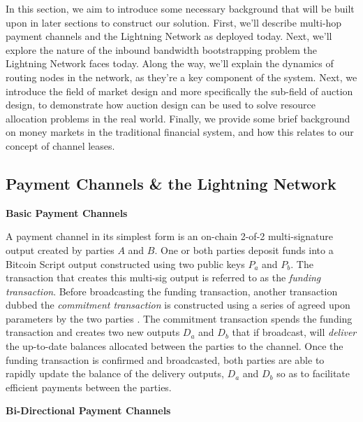 \documentclass[10pt,a4paper]{article}
\theoremstyle{definition}
\begin{document}
In this section, we aim to introduce some necessary background that will be
built upon in later sections to construct our solution. First, we'll describe
multi-hop payment channels and the Lightning Network as deployed today. Next,
we'll explore the nature of the inbound bandwidth bootstrapping problem the
Lightning Network faces today. Along the way, we'll explain the dynamics of
routing nodes in the network, as they're a key component of the system. Next,
we introduce the field of market design and more specifically the sub-field of auction
design, to demonstrate how auction design can be used to solve resource
allocation problems in the real world. Finally, we provide some brief background
on money markets in the traditional financial system, and how this relates to
our concept of channel leases.

\subsection{Payment Channels \& the Lightning Network}

\begin{center}
\textbf{Basic Payment Channels}
\end{center}

A payment channel in its simplest form is an on-chain 2-of-2 multi-signature
output created by parties $A$ and $B$. One or both parties deposit funds into a
Bitcoin Script output constructed using two public keys $P_{a}$ and $P_{b}$.
The transaction that creates this multi-sig output is referred to as the
\emph{funding transaction}. Before broadcasting the funding transaction,
another transaction dubbed the \emph{commitment transaction} is constructed
using a series of agreed upon parameters by the two parties \cite{bolt3}. The
commitment transaction spends the funding transaction and creates two new
outputs $D_{a}$ and $D_{b}$ that if broadcast, will \emph{deliver} the
up-to-date balances allocated between the parties to the channel. Once the
funding transaction is confirmed and broadcasted, both parties are able to
rapidly update the balance of the delivery outputs, $D_{a}$ and $D_{b}$ so as
to facilitate efficient payments between the parties. \\

\begin{center}
\textbf{Bi-Directional Payment Channels}
\end{center}
\end{document}
